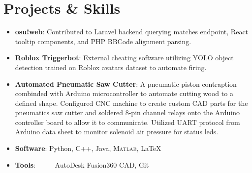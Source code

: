 \documentclass[letterpaper,11pt]{article}
\newcommand{\resumeItem}[2]{
  \item\small{
    \textbf{#1}{: #2 \vspace{-2pt}}
  }
}
\newcommand{\resumeSubItem}[2]{\resumeItem{#1}{#2}\vspace{-4pt}}
\newcommand{\resumeSubHeadingListStart}{\begin{itemize}[leftmargin=0in, label={}]}
\newcommand{\resumeSubHeadingListEnd}{\end{itemize}}
\begin{document}
\section{Projects \& Skills}
 \resumeSubHeadingListStart
    \resumeSubItem{osu!web}
      {Contributed to Laravel backend querying matches endpoint, React tooltip components, and PHP BBCode alignment parsing.}
    \resumeSubItem{Roblox Triggerbot}
      {External cheating software utilizing YOLO object detection trained on Roblox avatars dataset to automate firing.}
    \resumeSubItem{Automated Pneumatic Saw Cutter}
      {A pneumatic piston contraption combinded with Arduino microcontroller to automate cutting wood to a defined shape. Configured CNC machine to create custom CAD parts for the pneumatics saw cutter and soldered 8-pin channel relays onto the Arduino controller board to allow it to communicate. Utilized UART protocol from Arduino data sheet to monitor solenoid air pressure for status leds.}
      \vspace{15pt}
    \resumeSubItem{Software}
      {Python, C++, Java, \textsc{Matlab}\xspace, \LaTeX}
    \resumeSubItem{Tools}
      {\ \ \ \ \ AutoDesk Fusion360 CAD, Git}
 \resumeSubHeadingListEnd


\end{document}
